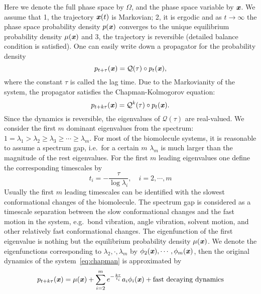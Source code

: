 \documentclass[aip,jcp,a4paper,reprint,unsortedaddress,onecolumn,fleqn]{revtex4-1}
\newcommand{\vect}[1]{\textbf{\textit{#1}}}
\begin{document}
Here we denote the full phase space by $\Omega$, and the phase space
variable by $\vect x$. We assume that 1, the trajectory $\vect x(t)$
is Markovian; 2, it is ergodic and as $t\rightarrow\infty$ the phase
space probability density $p(\vect x)$ converges to the unique
equilibrium probability density $\mu(\vect x)$ and 3, the trajectory
is reversible (detailed balance condition is satisfied). One can
easily write down a propagator for the probability density
\begin{equation}
\label{eq:propagator}  
p_{t+\tau}(\vect x) = \mathcal Q(\tau)\circ
p_t(\vect x),
\end{equation}
where the constant $\tau$ is called the lag time. Due to the
Markovianity of the system, the propagator satisfies the
Chapman-Kolmogorov equation:
\begin{equation}
  \label{eq:chapman}
  p_{t+k\tau}(\vect x) = \mathcal Q^k(\tau)\circ p_t(\vect x).
\end{equation}
Since the dynamics is reversible, the eigenvalues of $\mathcal
Q(\tau)$ are real-valued. We consider the first $m$ dominant
eigenvalues from the spectrum: $1 = \lambda_1 > \lambda_2 \geq
\lambda_3 \geq \cdots \geq \lambda_m$. For most of the biomolecule
systems, it is reasonable to assume a spectrum gap, i.e.~for a certain
$m$ $\lambda_m$ is much larger than the magnitude of the rest
eigenvalues. For the first $m$ leading eigenvalues one define the
corresponding timescales by
\begin{equation}
  \label{eq:timescale}
  t_i = -\frac{\tau}{\log \lambda_i}, \quad i= 2,\cdots, m
\end{equation}
Usually the first $m$ leading timescales can be identified with the
slowest conformational changes of the biomolecule. The spectrum gap is
considered as a timescale separation between the slow conformational
changes and the fast motion in the system, e.g.~bond vibration, angle
vibration, solvent motion, and other relatively fast conformational
changes. The eigenfunction of the first eigenvalue is nothing but the
equilibrium probability density $\mu(\vect x)$. We denote the
eigenfunctions corresponding to $\lambda_2, \cdot, \lambda_m$ by
$\phi_2(\vect x), \cdots, \phi_m(\vect x)$, then the original dynamics
of the system~\eqref{eq:chapman} is approximated by
\begin{equation}
  \label{eq:app-dynamics}
  p_{t+k\tau}(\vect x) = \mu(\vect x) + \sum_{i=2}^m e^{-\frac{k\tau}{t_i}} a_i \phi_i(\vect x) + \textrm{fast decaying dynamics}
\end{equation}
\end{document}
